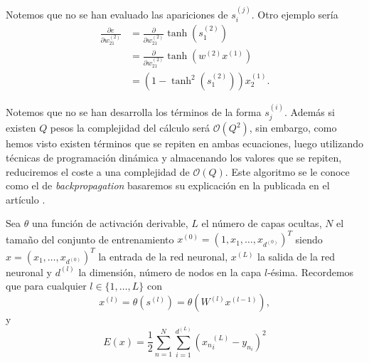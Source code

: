 Notemos que no se han evaluado las apariciones de $s_i^{(j)}$.
Otro ejemplo sería
\begin{align}
    \frac{\partial e}{\partial w^{(2)}_{21}} 
    &=
    \frac{\partial }{\partial w^{(2)}_{21}}
         \tanh \left(s^{(2)}_{1}\right)
    \\
    &= 
    \frac{\partial }{\partial w^{(2)}_{21}}
         \tanh \left(w^{(2)}x^{(1)}\right)
    \\
    &= \left(
    1- \tanh^2 \left(s^{(2)}_{1}\right) \right)x^{(1)}_2.
\end{align}

Notemos que no se han desarrolla los términos de la forma $s^{(i)}_j$. Además si existen $Q$ pesos la complejidad del cálculo será $\mathcal{O}(Q^2)$, sin embargo, como hemos visto existen términos que se repiten en ambas ecuaciones, luego utilizando técnicas de 
programación dinámica y almacenando los valores que se repiten, 
reduciremos el coste a una complejidad de $\mathcal{O}(Q).$ Este 
algoritmo se le conoce como el de \textit{backpropagation}
basaremos su explicación en la publicada en
el artículo \cite{backpropagation-Hinton}.


Sea $\theta$ una función de activación derivable, 
 $L$ el número de capas ocultas, $N$ el tamaño del conjunto de entrenamiento $x^{(0)} = (1, x_1, \ldots, x_{d^{(0)}})^T$ 
siendo $x = (x_1, \ldots, x_{d^{(0)}})^T$ la entrada de la red neuronal, $x^{(L)}$ la salida de la red neuronal y 
$d^{(l)}$ la dimensión, número de nodos en la capa $l$-ésima. 
Recordemos que 
para cualquier $l \in \{1, \ldots, L\}$ con
\begin{equation}
    x^{(l)}
     = 
     \theta \left( s^{(l)}\right) 
     = 
     \theta \left( W^{(l)} x^{(l-1)}\right),
\end{equation}
y
\begin{equation}
    E(x) = \frac{1}{2} 
    \sum_{n = 1}^{N}
    \sum_{i = 1}^{d^{(L)}}
    \left({x_n}^{(L)}_i-y_{n_i} \right)^2
\end{equation}

